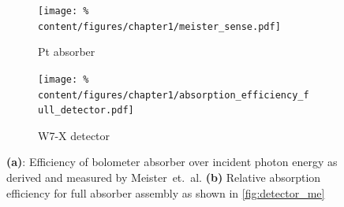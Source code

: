            \begin{figure}[t]%
                \centering%
                \begin{subfigure}{0.53\textwidth}%
                    \texttt{[image: \%
                        content/figures/chapter1/meister\_sense.pdf]}%
                    \caption{Pt absorber\cite{Meister2013}}\label{fig:pt_absorber}%
                \end{subfigure}%
                \hspace*{0.75cm}%
                \begin{subfigure}{0.35\textwidth}%
                    \texttt{[image: \%
                        content/figures/chapter1/absorption\_efficiency\_full\_detector.pdf]}%
                    \caption{W7-X detector\cite{Zhang2024}}\label{fig:absorp_effic}%
                \end{subfigure}%
                \caption{\textbf{(a)}: Efficiency of bolometer absorber over incident photon energy as derived and measured by Meister~et.~al\cite{Meister2013}. \textbf{(b)} Relative absorption efficiency for full absorber assembly as shown in \cref{fig:detector_me}}\label{fig:sensitivity_meister}%
            \end{figure}%
%
